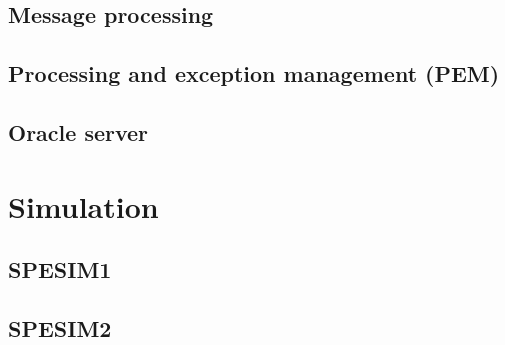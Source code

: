 \documentclass[a4paper,11pt]{report}
\begin{document}
\section*{Message processing}

\section*{Processing and exception management (PEM)}

\section*{Oracle server}

\chapter*{Simulation}

\section*{SPESIM1}

\section*{SPESIM2}

\end{document}
